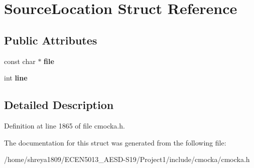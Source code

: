 \hypertarget{structSourceLocation}{}\section{Source\+Location Struct Reference}
\label{structSourceLocation}
\subsection*{Public Attributes}
\begin{DoxyCompactItemize}
\item 
\mbox{\label{structSourceLocation_abe1a3fee04b49b1ea16c433d345d9e3d}} 
const char $\ast$ {\bfseries file}
\item 
\mbox{\label{structSourceLocation_a0841da7b3abbe7aca24bb57f071e1042}} 
int {\bfseries line}
\end{DoxyCompactItemize}


\subsection{Detailed Description}


Definition at line 1865 of file cmocka.\+h.



The documentation for this struct was generated from the following file\+:\begin{DoxyCompactItemize}
\item 
/home/shreya1809/\+E\+C\+E\+N5013\+\_\+\+A\+E\+S\+D-\/\+S19/\+Project1/include/cmocka/cmocka.\+h\end{DoxyCompactItemize}
